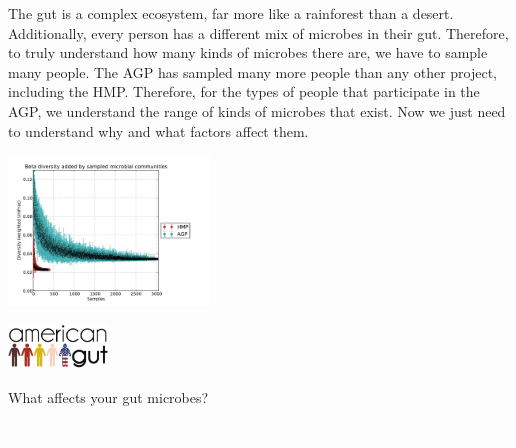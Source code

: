 \documentclass[10pt,letterpaper]{article}
\begin{document}
The gut is a complex ecosystem, far more like a rainforest than a desert.  Additionally, every person has a different mix of microbes in their gut.  Therefore, to truly understand how many kinds of microbes there are, we have to sample many people.  The AGP has sampled many more people than any other project, including the HMP. Therefore, for the types of people that participate in the AGP, we understand the range of kinds of microbes that exist. Now we just need to understand why and what factors affect them.

\begin{framed}
\parbox{0.45\textwidth}{
\includegraphics[width=0.4\textwidth]{pdfs-mod1/fig5.pdf}
}
\hspace{5mm}
\parbox{0.50\textwidth}{
}
\vspace{-2mm}
\label{fig5} 
\end{framed}
\newpage

\parbox{4.5cm}{
	\includegraphics[width=0.2\textwidth]{pdfs-mod1/logoshape.pdf}
}
\parbox{14cm}{
	\fontsize{20pt}{24pt}\selectfont
	What affects your gut microbes?
}

\colorbox{agpBrown}{\parbox{\textwidth}{\vspace{1mm} \LARGE \centering \textcolor{white}{Factors that affect your gut habitat} \vspace{1mm}}}
\end{document}
